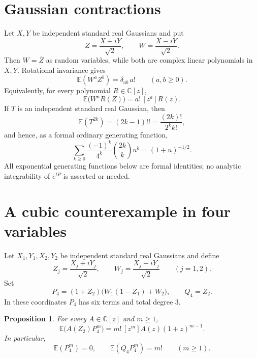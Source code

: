 \documentclass[11pt]{article}
\newcommand{\C}{\mathbb C}
\newcommand{\E}{\mathbb E}
\newtheorem{proposition}[theorem]{Proposition}
\theoremstyle{remark}
\begin{document}
\section{Gaussian contractions}

Let $X,Y$ be independent standard real Gaussians and put
\[
  Z=\frac{X+iY}{\sqrt2},\qquad W=\frac{X-iY}{\sqrt2}.
\]
Then $W=\overline Z$ as random variables, while both are complex linear polynomials in $X,Y$.  Rotational invariance gives
\begin{equation}\label{eq:contraction}
  \E(W^aZ^b)=\delta_{ab}\,a!\qquad(a,b\geq0).
\end{equation}
Equivalently, for every polynomial $R\in\C[z]$,
\begin{equation}\label{eq:coefficient-contraction}
  \E\bigl(W^aR(Z)\bigr)=a!\,[z^a]R(z).
\end{equation}
If $T$ is an independent standard real Gaussian, then
\begin{equation}\label{eq:real-gaussian}
  \E(T^{2k})=(2k-1)!!=\frac{(2k)!}{2^k k!},
\end{equation}
and hence, as a formal ordinary generating function,
\begin{equation}\label{eq:central-binomial}
  \sum_{k\geq0}\frac{(-1)^k}{4^k}\binom{2k}{k}u^k=(1+u)^{-1/2}.
\end{equation}
All exponential generating functions below are formal identities; no analytic integrability of $e^{tP}$ is asserted or needed.

\section{A cubic counterexample in four variables}

Let $X_1,Y_1,X_2,Y_2$ be independent standard real Gaussians and define
\[
  Z_j=\frac{X_j+iY_j}{\sqrt2},\qquad
  W_j=\frac{X_j-iY_j}{\sqrt2}\qquad(j=1,2).
\]
Set
\begin{equation}\label{eq:P4}
  P_4=(1+Z_2)\bigl(W_1(1-Z_1)+W_2\bigr),
  \qquad Q_4=Z_2.
\end{equation}
In these coordinates $P_4$ has six terms and total degree $3$.

\begin{proposition}\label{prop:four}
For every $A\in\C[z]$ and $m\geq1$,
\begin{equation}\label{eq:master-four}
  \E\bigl(A(Z_2)P_4^m\bigr)
  =m!\,[z^m]A(z)(1+z)^{m-1}.
\end{equation}
In particular,
\[
  \E(P_4^m)=0,
  \qquad
  \E(Q_4P_4^m)=m!
  \qquad(m\geq1).
\]
\end{proposition}
\end{document}
